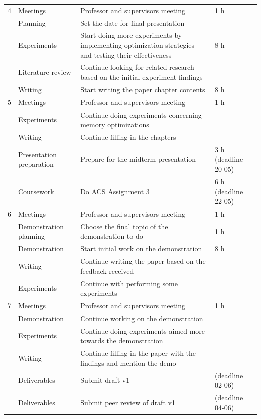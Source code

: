 \documentclass[english, a4paper]{article}
\begin{document}
\begin{longtable}{p{1.0cm} p{3.1cm} p{7.0cm} p{3.0cm}}
4 & Meetings & Professor and supervisors meeting & 1 h \\
    & Planning & Set the date for final presentation & \\
    & Experiments & Start doing more experiments by implementing optimization strategies and testing their effectiveness & 8 h \\
    & Literature review & Continue looking for related research based on the initial experiment findings &  \\
    & Writing & Start writing the paper chapter contents & 8 h \\
\hline

5 & Meetings & Professor and supervisors meeting & 1 h \\
    & Experiments & Continue doing experiments concerning memory optimizations &  \\
    & Writing & Continue filling in the chapters &  \\
    & Presentation preparation & Prepare for the midterm presentation & 3 h (deadline 20-05) \\
    & Coursework & Do ACS Assignment 3 & 6 h (deadline 22-05) \\
\hline

6 & Meetings & Professor and supervisors meeting & 1 h \\
    & Demonstration planning & Choose the final topic of the demonstration to do & 1 h \\
    & Demonstration & Start initial work on the demonstration & 8 h \\
    & Writing & Continue writing the paper based on the feedback received &  \\
    & Experiments & Continue with performing some experiments &  \\
\hline

7 & Meetings & Professor and supervisors meeting & 1 h \\
    & Demonstration & Continue working on the demonstration &  \\
    & Experiments & Continue doing experiments aimed more towards the demonstration &  \\
    & Writing & Continue filling in the paper with the findings and mention the demo &  \\
    & Deliverables & Submit draft v1 & (deadline 02-06) \\
    & Deliverables & Submit peer review of draft v1 & (deadline 04-06)  \\
\hline


\end{longtable}
\end{document}
